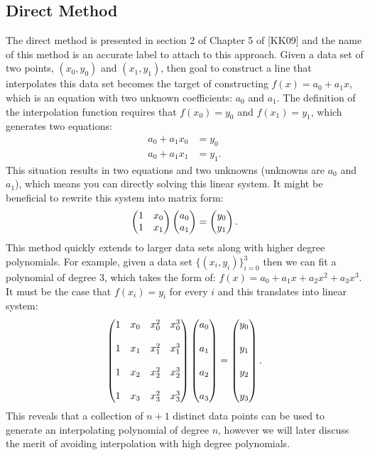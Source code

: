 \documentclass[twoside]{article}
\renewcommand{\cite}[1]{[#1]}
\def\ds{\displaystyle}
\begin{document}
\subsection{Direct Method}
The direct method is presented in section 2 of Chapter 5 of \cite{KK09} and the name of this method is an accurate label to attach to this approach. Given a data set of two points, $\ds (x_0,y_0)$ and $\ds (x_1, y_1)$, then goal to construct a line that interpolates this data set becomes the target of constructing $\ds f(x)=a_0 + a_1 x$, which is an equation with two unknown coefficients: $\ds a_0$ and $\ds a_1$. The definition of the interpolation function requires that $\ds f(x_0)=y_0$ and $\ds f(x_1)=y_1$, which generates two equations:
\begin{align*}
    a_0 + a_1 x_0 &= y_0\\
    a_0 + a_1 x_1 &= y_1.
\end{align*}
This situation results in two equations and two unknowns (unknowns are $\ds a_0$ and $\ds a_1$), which means you can directly solving this linear system. It might be beneficial to rewrite this system into matrix form:
$$\begin{pmatrix} 1 & x_0 \cr 1 & x_1 \end{pmatrix}\begin{pmatrix} a_0 \cr a_1 \end{pmatrix} = \begin{pmatrix} y_0 \cr y_1 \end{pmatrix}.$$
This method quickly extends to larger data sets along with higher degree polynomials. For example, given a data set $\ds \{(x_i,y_i)\}_{i=0}^3$ then we can fit a polynomial of degree 3, which takes the form of: $\ds f(x) = a_0 + a_1 x + a_2 x^2 + a_3 x^3$. It must be the case that $\ds f(x_i)=y_i$ for every $i$ and this translates into linear system:
$$\begin{pmatrix} 1 & x_0 & x_0^2 & x_0^3 \cr  \cr 1 & x_1 & x_1^2 & x_1^3 \cr \cr 1 & x_2 & x_2^2 & x_2^3 \cr \cr 1 & x_3 & x_3^2 & x_3^3 \end{pmatrix}\begin{pmatrix} a_0 \cr \cr a_1 \cr \cr a_2 \cr  \cr a_3 \end{pmatrix} = \begin{pmatrix} y_0 \cr \cr  y_1 \cr \cr y_2 \cr \cr y_3 \end{pmatrix}.$$
This reveals that a collection of $n+1$ distinct data points can be used to generate an interpolating polynomial of degree $n$, however we will later discuss the merit of avoiding interpolation with high degree polynomials. 
\end{document}
